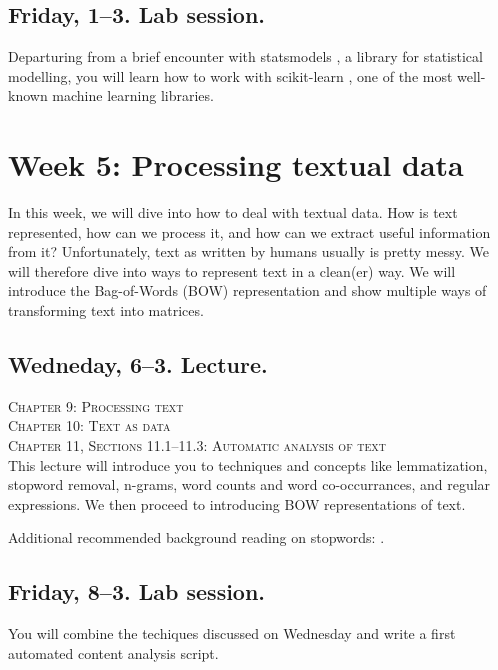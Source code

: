 \subsection*{Friday, 1--3. Lab session.}

Departuring from a brief encounter with statsmodels \citep{statsmodels}, a library for statistical modelling, you will learn how to work with scikit-learn \citep{scikit-learn}, one of the most well-known machine learning libraries.





\section*{Week 5: Processing textual data}
In this week, we will dive into how to deal with textual data. How is text represented, how can we process it, and how can we extract useful information from it?
Unfortunately, text as written by humans usually is pretty messy.  We will therefore dive  into ways to represent text in a clean(er) way. We will introduce the Bag-of-Words (BOW) representation and show multiple ways of transforming text into matrices.


\subsection*{Wedneday, 6--3. Lecture.}
\textsc{ Chapter 9: Processing text}\\
\textsc{ Chapter 10: Text as data}\\
\textsc{ Chapter 11, Sections 11.1--11.3: Automatic analysis of text}\\
  
This lecture will introduce you to techniques and concepts like lemmatization, stopword removal, n-grams, word counts and word co-occurrances, and regular expressions. We then proceed to introducing BOW representations of text.

Additional recommended background reading on stopwords: \cite{Nothman2018}.


\subsection*{Friday, 8--3. Lab session.}
You will combine the techiques discussed on Wednesday and write a first automated content analysis script.


